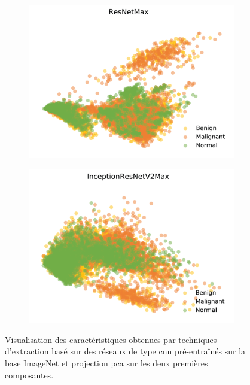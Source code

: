 \begin{figure}[H]
\begin{subfigure}{.2\textwidth}
      \includegraphics[width=\textwidth]{contents/chapter_4/resources/visualisation_transfer_resnetmax.png}
    \end{subfigure}
    \begin{subfigure}{.2\textwidth}
      \includegraphics[width=\textwidth]{contents/chapter_4/resources/visualisation_transfer_inceptionresnetv2max.png}
    \end{subfigure}
    
    \caption{Visualisation des caractéristiques obtenues par techniques d'extraction basé sur des réseaux de type \gls{cnn} pré-entraînés sur la base ImageNet et projection \gls{pca} sur les deux premières composantes.}
    \label{fig:visualisation_transfer}
\end{figure}\par


